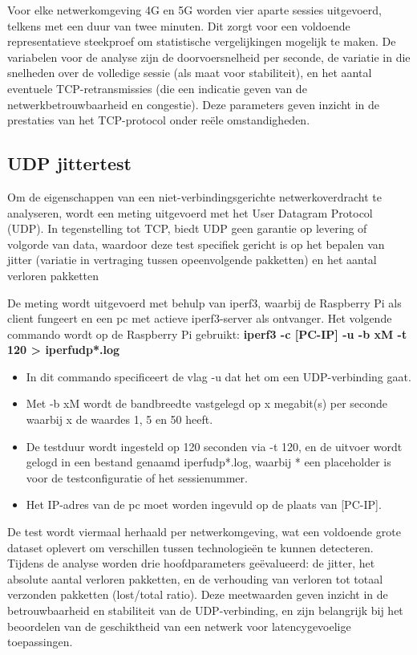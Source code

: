 Voor elke netwerkomgeving 4G en 5G worden vier aparte sessies uitgevoerd, telkens met een duur van twee minuten. Dit zorgt voor een voldoende representatieve steekproef om statistische vergelijkingen mogelijk te maken. 
De variabelen voor de analyse zijn de doorvoersnelheid per seconde, de variatie in die snelheden over de volledige sessie (als maat voor stabiliteit), en het aantal eventuele TCP-retransmissies (die een indicatie geven van de  netwerkbetrouwbaarheid en congestie). Deze parameters geven inzicht in de prestaties van het TCP-protocol onder reële omstandigheden.

\subsection{UDP jittertest}
Om de eigenschappen van een niet-verbindingsgerichte netwerkoverdracht te analyseren, wordt een meting uitgevoerd met het User Datagram Protocol (UDP). In tegenstelling tot TCP, biedt UDP geen garantie op levering of volgorde van data, waardoor deze test specifiek gericht is op het bepalen van jitter (variatie in vertraging tussen opeenvolgende pakketten) en het aantal verloren pakketten

De meting wordt uitgevoerd met behulp van iperf3, waarbij de Raspberry Pi als client fungeert en een pc met actieve iperf3-server als ontvanger. Het volgende commando wordt op de Raspberry Pi gebruikt: \textbf{iperf3 -c [PC-IP] -u -b xM -t 120 > iperfudp*.log}

\begin{itemize}
    \item In dit commando specificeert de vlag -u dat het om een UDP-verbinding gaat. 
    \item Met -b xM wordt de bandbreedte vastgelegd op x megabit(s) per seconde waarbij x de waardes 1, 5 en 50 heeft.
    \item De testduur wordt ingesteld op 120 seconden via -t 120, en de uitvoer wordt gelogd in een bestand genaamd iperfudp*.log, waarbij * een placeholder is voor de testconfiguratie of het sessienummer. 
    \item Het IP-adres van de pc moet worden ingevuld op de plaats van [PC-IP].
\end{itemize}


De test wordt viermaal herhaald per netwerkomgeving, wat een voldoende grote dataset oplevert om verschillen tussen technologieën te kunnen detecteren. 
Tijdens de analyse worden drie hoofdparameters geëvalueerd: de jitter, het absolute aantal verloren pakketten, en de verhouding van verloren tot totaal verzonden pakketten (lost/total ratio). Deze meetwaarden geven inzicht in de betrouwbaarheid en stabiliteit van de UDP-verbinding, en zijn belangrijk bij het beoordelen van de geschiktheid van een netwerk voor latencygevoelige toepassingen.

